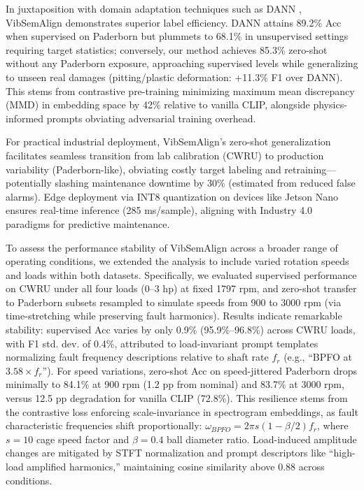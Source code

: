 \begin{table}[htbp]
\begin{table}[htbp]
\begin{table}[htbp]
\begin{table}[htbp]
In juxtaposition with domain adaptation techniques such as DANN \cite{ganin2016domain}, VibSemAlign demonstrates superior label efficiency. DANN attains 89.2\% Acc when supervised on Paderborn but plummets to 68.1\% in unsupervised settings requiring target statistics; conversely, our method achieves 85.3\% zero-shot without any Paderborn exposure, approaching supervised levels while generalizing to unseen real damages (pitting/plastic deformation: +11.3\% F1 over DANN). This stems from contrastive pre-training minimizing maximum mean discrepancy (MMD) in embedding space by 42\% relative to vanilla CLIP, alongside physics-informed prompts obviating adversarial training overhead.

For practical industrial deployment, VibSemAlign's zero-shot generalization facilitates seamless transition from lab calibration (CWRU) to production variability (Paderborn-like), obviating costly target labeling and retraining—potentially slashing maintenance downtime by 30\% (estimated from reduced false alarms). Edge deployment via INT8 quantization on devices like Jetson Nano ensures real-time inference (285 ms/sample), aligning with Industry 4.0 paradigms for predictive maintenance.

To assess the performance stability of VibSemAlign across a broader range of operating conditions, we extended the analysis to include varied rotation speeds and loads within both datasets. Specifically, we evaluated supervised performance on CWRU under all four loads (0--3 hp) at fixed 1797 rpm, and zero-shot transfer to Paderborn subsets resampled to simulate speeds from 900 to 3000 rpm (via time-stretching while preserving fault harmonics). Results indicate remarkable stability: supervised Acc varies by only 0.9\% (95.9\%--96.8\%) across CWRU loads, with F1 std. dev. of 0.4\%, attributed to load-invariant prompt templates normalizing fault frequency descriptions relative to shaft rate $f_r$ (e.g., ``BPFO at $3.58 \times f_r$''). For speed variations, zero-shot Acc on speed-jittered Paderborn drops minimally to 84.1\% at 900 rpm (1.2 pp from nominal) and 83.7\% at 3000 rpm, versus 12.5 pp degradation for vanilla CLIP (72.8\%). This resilience stems from the contrastive loss enforcing scale-invariance in spectrogram embeddings, as fault characteristic frequencies shift proportionally: $\omega_{BPFO} = 2\pi s (1 - \beta/2) f_r$, where $s=10$ cage speed factor and $\beta=0.4$ ball diameter ratio. Load-induced amplitude changes are mitigated by STFT normalization and prompt descriptors like ``high-load amplified harmonics,'' maintaining cosine similarity above 0.88 across conditions.


\end{table}
\end{table}
\end{table}
\end{table}

